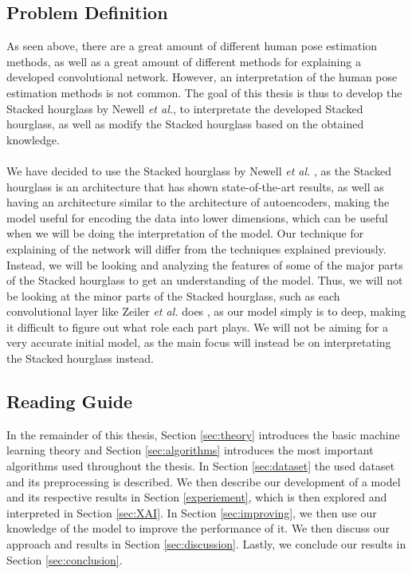 \documentclass[./main.tex]{subfiles}
\begin{document}
\subsection{Problem Definition}
As seen above, there are a great amount of different human pose estimation methods, as well as a great amount of different methods for explaining a developed convolutional network. However, an interpretation of the human pose estimation methods is not common. The goal of this thesis is thus to develop the Stacked hourglass by Newell \textit{et al.}, to interpretate the developed Stacked hourglass, as well as modify the Stacked hourglass based on the obtained knowledge.
\\
\\
We have decided to use the Stacked hourglass by Newell \textit{et al.} \cite{Newell}, as the Stacked hourglass is an architecture that has shown state-of-the-art results, as well as having an architecture similar to the architecture of autoencoders, making the model useful for encoding the data into lower dimensions, which can be useful when we will be doing the interpretation of the model. Our technique for explaining of the network will differ from the techniques explained previously. Instead, we will be looking and analyzing the features of some of the major parts of the Stacked hourglass to get an understanding of the model. Thus, we will not be looking at the minor parts of the Stacked hourglass, such as each convolutional layer like Zeiler \textit{et al.} does \cite{Zeiler}, as our model simply is to deep, making it difficult to figure out what role each part plays. We will not be aiming for a very accurate initial model, as the main focus will instead be on interpretating the Stacked hourglass instead.

\subsection{Reading Guide}
In the remainder of this thesis, Section \ref{sec:theory} introduces the basic machine learning theory and Section \ref{sec:algorithms} introduces the most important algorithms used throughout the thesis. In Section \ref{sec:dataset} the used dataset and its preprocessing is described. We then describe our development of a model and its respective results in Section \ref{experiement}, which is then explored and interpreted in Section \ref{sec:XAI}. In Section \ref{sec:improving}, we then use our knowledge of the model to improve the performance of it. We then discuss our approach and results in Section \ref{sec:discussion}. Lastly, we conclude our results in Section \ref{sec:conclusion}.
\end{document}
